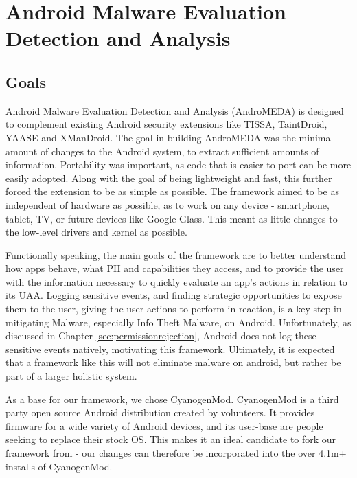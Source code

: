 \chapter{Android Malware Evaluation Detection and Analysis}
\label{sec:architecture}

\section{Goals}
Android Malware Evaluation Detection and Analysis (AndroMEDA) is designed to complement existing Android security extensions like TISSA\citep{zhou2011taming}, TaintDroid\citep{enck2010taintdroid}, YAASE\citep{russello2011yaase} and XManDroid\citep{bugiel2011xmandroid}. The goal in building AndroMEDA was the minimal amount of changes to the Android system, to extract sufficient amounts of information. Portability was important, as code that is easier to port can be more easily adopted. Along with the goal of being lightweight and fast, this further forced the extension to be as simple as possible. The framework aimed to be as independent of hardware as possible, as to work on any device - smartphone, tablet, TV, or future devices like Google Glass. This meant as little changes to the low-level drivers and kernel as possible.

Functionally speaking, the main goals of the framework are to better understand how apps behave, what PII and capabilities they access, and to provide the user with the information necessary to quickly evaluate an app's actions in relation to its UAA. Logging sensitive events, and finding strategic opportunities to expose them to the user, giving the user actions to perform in reaction, is a key step in mitigating Malware, especially Info Theft Malware, on Android. Unfortunately, as discussed in Chapter \ref{sec:permissionrejection}, Android does not log these sensitive events natively, motivating this framework. Ultimately, it is expected that a framework like this will not eliminate malware on android, but rather be part of a larger holistic system.

As a base for our framework, we chose CyanogenMod\citep{cyanogenmod}. CyanogenMod is a third party open source Android distribution created by volunteers. It provides firmware for a wide variety of Android devices, and its user-base are people seeking to replace their stock OS. This makes it an ideal candidate to fork our framework from - our changes can therefore be incorporated into the over 4.1m+ installs of CyanogenMod\citep{cyanogenmodstats}.

